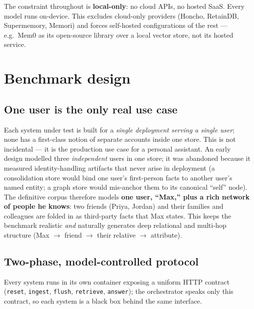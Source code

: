 \documentclass[11pt]{article}
\begin{document}
The constraint throughout is \textbf{local-only}: no cloud APIs, no hosted SaaS. Every model runs on-device.
This excludes cloud-only providers (Honcho, RetainDB, Supermemory, Memori) and forces self-hosted
configurations of the rest --- e.g.\ Mem0 as its open-source library over a local vector store, not its hosted
service.

\section{Benchmark design}

\subsection{One user is the only real use case}\label{sec:single-user}
Each system under test is built for a \emph{single deployment serving a single user}; none has a first-class
notion of separate accounts inside one store. This is not incidental --- it is the production use case for a
personal assistant. An early design modelled three \emph{independent} users in one store; it was abandoned
because it measured identity-handling artifacts that never arise in deployment (a consolidation store would
bind one user's first-person facts to another user's named entity; a graph store would mis-anchor them to its
canonical ``self'' node). The definitive corpus therefore models \textbf{one user, ``Max,'' plus a rich
network of people he knows}: two friends (Priya, Jordan) and their families and colleagues are folded in as
third-party facts that Max states. This keeps the benchmark realistic \emph{and} naturally generates deep
relational and multi-hop structure (Max $\to$ friend $\to$ their relative $\to$ attribute).

\subsection{Two-phase, model-controlled protocol}
Every system runs in its own container exposing a uniform HTTP contract (\texttt{reset}, \texttt{ingest},
\texttt{flush}, \texttt{retrieve}, \texttt{answer}); the orchestrator speaks only this contract, so each system
is a black box behind the same interface.
\end{document}
